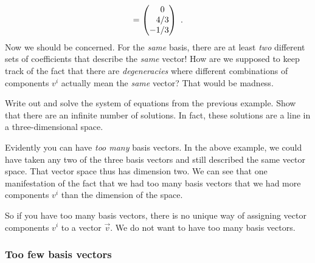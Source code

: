 \documentclass[12pt, oneside]{report}    %
\begin{document}
\begin{example}
\begin{align}
    =
    \begin{pmatrix}
        \pp 0 \\ \pp 4/3 \\ - 1/3
    \end{pmatrix} \ .
\end{align}
Now we should be concerned. For the \emph{same} basis, there are at least \emph{two} different sets of coefficients that describe the \emph{same} vector! How are we supposed to keep track of the fact that there are \emph{degeneracies} where different combinations of components $v^i$ actually mean the \emph{same} vector? That would be madness.\sidenotemark
\end{example}
\begin{exercise}
Write out and solve the system of equations from the previous example. Show that there are an infinite number of solutions. In fact, these solutions are a line in a three-dimensional space.
\end{exercise}

Evidently you can have \emph{too many} basis vectors. In the above example, we could have taken any two of the three basis vectors and still described the same vector space. That vector space thus has dimension two. We can see that one manifestation of the fact that we had too many basis vectors that we had more components $v^i$ than the dimension of the space.

So if you have too many basis vectors, there is no unique way of assigning vector components $v^i$ to a vector $\vec{v}$. We do not want to have too many basis vectors. 


\subsubsection{Too few basis vectors}
\end{document}
